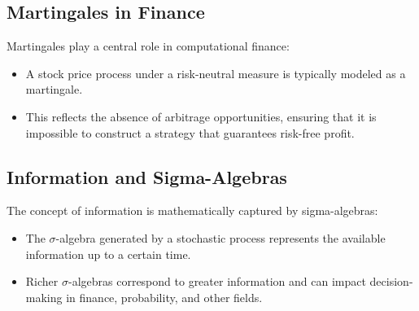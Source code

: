 \subsection{Martingales in Finance}
Martingales play a central role in computational finance:
\begin{itemize}
    \item A stock price process under a risk-neutral measure is typically modeled as a martingale.
    \item This reflects the absence of arbitrage opportunities, ensuring that it is impossible to construct a strategy that guarantees risk-free profit.
\end{itemize}

\subsection{Information and Sigma-Algebras}
The concept of information is mathematically captured by sigma-algebras:
\begin{itemize}
    \item The \(\sigma\)-algebra generated by a stochastic process represents the available information up to a certain time.
    \item Richer \(\sigma\)-algebras correspond to greater information and can impact decision-making in finance, probability, and other fields.
\end{itemize}
